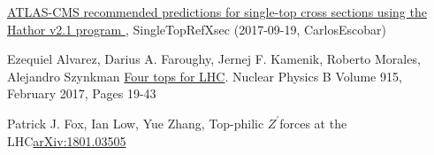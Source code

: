 \documentclass[12pt,a4paper]{article}		%
\begin{document}
\begin{thebibliography}{}
	 \href{https://twiki.cern.ch/twiki/bin/view/LHCPhysics/SingleTopRefXsec}{ATLAS-CMS recommended predictions for single-top cross sections using the Hathor v2.1 program } , SingleTopRefXsec (2017-09-19, CarlosEscobar)
	
	 Ezequiel Alvarez, Darius A. Faroughy, Jernej F. Kamenik, Roberto Morales, Alejandro Szynkman \href{https://www.sciencedirect.com/journal/nuclear-physics-b/vol/915/suppl/C}{Four tops for LHC}. Nuclear Physics B
	Volume 915, February 2017, Pages 19-43
	
	 Patrick J. Fox, Ian Low, Yue Zhang, Top-philic $Z^\prime $forces at the LHC\href{https://link.springer.com/content/pdf/10.1007%2FJHEP03%282018%29074.pdf}{arXiv:1801.03505}
		
\end{thebibliography} 

\newpage
\thispagestyle{empty}
\listoffigures
\newpage
\listoftables
\end{document}
